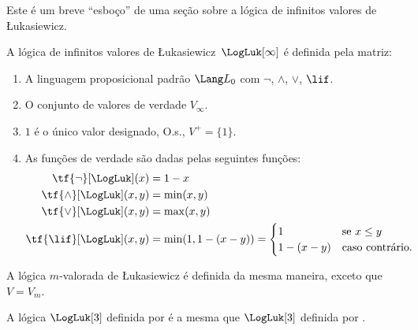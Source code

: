 \documentclass[../../../include/open-logic-section]{subfiles}
\begin{document}


\begin{editorial}
  Este é um breve ``esboço'' de uma seção sobre a lógica de infinitos
  valores de \L ukasiewicz.
\end{editorial}

\begin{defn} A lógica de infinitos valores de
\L ukasiewicz~$\LogLuk[\infty]$ é definida pela matriz:
\begin{enumerate}
  \item A linguagem proposicional padrão $\Lang L_0$ com
  $\lnot$, $\land$, $\lor$, $\lif$.
  \item O conjunto de valores de verdade $V_\infty$.
  \item $1$ é o único valor designado, O.s.\@, $V^+ = \{1\}$.
  \item As funções de verdade são dadas pelas seguintes funções:
  \begin{align*}
    \tf{\lnot}[\LogLuk](x) & = 1 - x\\
    \tf{\land}[\LogLuk](x,y) & = \min(x,y)\\
    \tf{\lor}[\LogLuk](x,y) & = \max(x,y)\\
    \tf{\lif}[\LogLuk](x,y) & = \min(1,1-(x-y)) = \begin{cases}
      1 & \text{se } x \le y\\
      1-(x-y) & \text{caso contrário.}
    \end{cases}
    \end{align*}
\end{enumerate}
A lógica $m$-valorada de \L ukasiewicz é definida da mesma maneira,
exceto que $V = V_m$.
\end{defn}

\begin{prop}
  A lógica $\LogLuk[3]$ definida por 
  é a mesma que $\LogLuk[3]$ definida por .
\end{prop}
\end{document}
